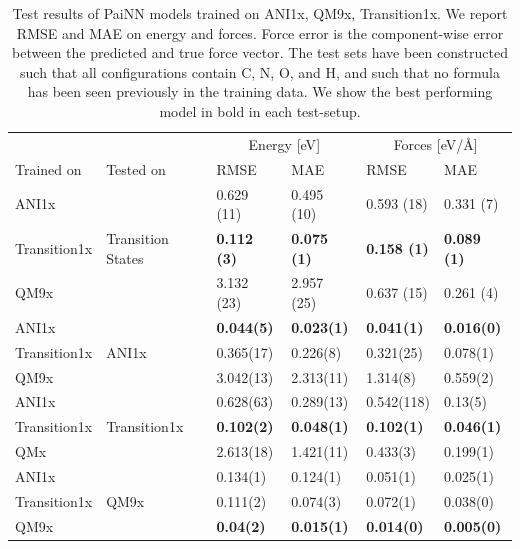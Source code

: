 \documentclass[twoside,twocolumn]{article}
\begin{document}
\begin{table}[ht]
\centering
\begin{tabular}{|ll|ll|ll|}
\hline
              &           & \multicolumn{2}{c|}{Energy {[}eV{]}} & \multicolumn{2}{c|}{Forces {[}eV/Å{]}} \\
              
Trained on    & Tested on & RMSE              & MAE              & RMSE               & MAE               \\
\hline

ANI1x         &  &0.629 (11)   &0.495 (10)  & 0.593 (18)   & 0.331 (7) \\
Transition1x           & Transition States & \textbf{0.112 (3)}  & \textbf{0.075 (1)} & \textbf{ 0.158 (1)}  & \textbf{0.089 (1)} \\
QM9x          &  & 3.132 (23)  & 2.957 (25) & 0.637 (15)  & 0.261 (4) \\ 

\hline
ANI1x         &  & \textbf{0.044(5)}   &\textbf{ 0.023(1)}  & \textbf{0.041(1)}   & \textbf{0.016(0)} \\
Transition1x           & ANI1x & 0.365(17)  & 0.226(8) & 0.321(25)  & 0.078(1) \\
QM9x           &  & 3.042(13)  & 2.313(11) & 1.314(8)   & 0.559(2) \\ 
\hline

ANI1x         &    & 0.628(63)  & 0.289(13) & 0.542(118) &0.13(5)  \\
Transition1x           &  Transition1x  & \textbf{0.102(2)}   & \textbf{0.048(1)}  & \textbf{0.102(1)}   & \textbf{0.046(1)} \\
QMx          &    & 2.613(18)  & 1.421(11) & 0.433(3)  & 0.199(1)\\ 
\hline


ANI1x         &    & 0.134(1)   & 0.124(1)  & 0.051(1)   & 0.025(1) \\
Transition1x           &  QM9x  & 0.111(2)   & 0.074(3)  & 0.072(1)   & 0.038(0) \\
QM9x           &    & \textbf{0.04(2)}    & \textbf{0.015(1) } &\textbf{ 0.014(0)}   &\textbf{ 0.005(0)} \\

\hline
\end{tabular}
\caption{Test results of PaiNN models trained on ANI1x, QM9x, Transition1x. We report RMSE and MAE on energy and forces. Force error is the component-wise error between the predicted and true force vector. The test sets have been constructed such that all configurations contain C, N, O, and H, and such that no formula has been seen previously in the training data. We show the best performing model in bold in each test-setup.}
\label{tab:eval}
\end{table}
\end{document}
